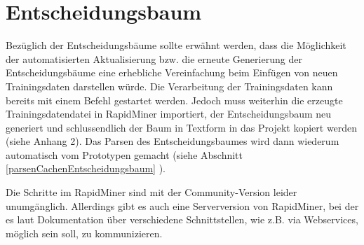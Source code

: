 \section{Entscheidungsbaum}
Bezüglich der Entscheidungsbäume sollte erwähnt werden, dass die Möglichkeit der automatisierten Aktualisierung bzw. die erneute Generierung der Entscheidungsbäume eine erhebliche Vereinfachung beim Einfügen von neuen Trainingsdaten darstellen würde. Die Verarbeitung der Trainingsdaten kann bereits mit einem Befehl gestartet werden. Jedoch muss weiterhin die erzeugte Trainingsdatendatei in RapidMiner importiert, der Entscheidungsbaum neu generiert und schlussendlich der Baum in Textform in das Projekt kopiert werden (siehe Anhang 2). Das Parsen des Entscheidungsbaumes wird dann wiederum automatisch vom Prototypen gemacht (siehe Abschnitt \ref{parsenCachenEntscheidungsbaum} ). 

Die Schritte im RapidMiner sind mit der Community-Version leider unumgänglich. Allerdings gibt es auch eine Serverversion von RapidMiner, bei der es laut Dokumentation über verschiedene Schnittstellen, wie z.B. via Webservices, möglich sein soll, zu kommunizieren.
